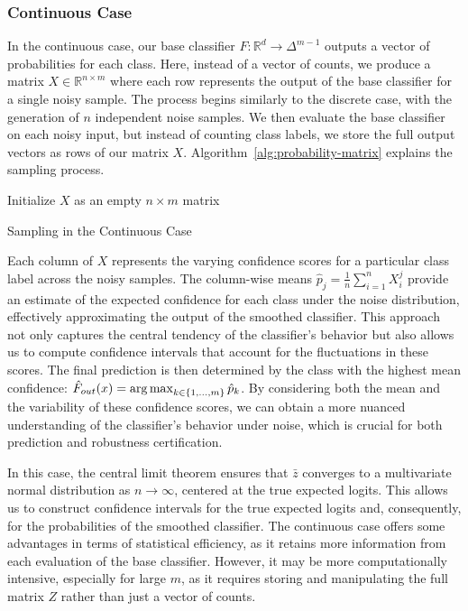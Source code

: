 \subsubsection{Continuous Case}\label{subsubsec:continuous-case-monte-carlo-simulation}
In the continuous case, our base classifier $F: \mathbb{R}^d \rightarrow \Delta^{m-1}$ outputs a vector of probabilities for each class.
Here, instead of a vector of counts, we produce a matrix $X \in \mathbb{R}^{n \times m}$ where each row represents the output of the base classifier for a single noisy sample.
The process begins similarly to the discrete case, with the generation of $n$ independent noise samples.
We then evaluate the base classifier on each noisy input, but instead of counting class labels, we store the full output vectors as rows of our matrix $X$.
Algorithm~\ref{alg:probability-matrix} explains the sampling process.
\begin{algorithm}[h]
    \DontPrintSemicolon
    Initialize $X$ as an empty $n \times m$ matrix\;
    \caption{Sampling in the Continuous Case}\label{alg:probability-matrix}
\end{algorithm}

Each column of $X$ represents the varying confidence scores for a particular class label across the noisy samples.
The column-wise means $\hat{p}_j = \frac{1}{n} \sum_{i=1}^n X_i^j$ provide an estimate of the expected confidence for each class under the noise distribution, effectively approximating the output of the smoothed classifier.
This approach not only captures the central tendency of the classifier's behavior but also allows us to compute confidence intervals that account for the fluctuations in these scores.
The final prediction is then determined by the class with the highest mean confidence: $\hat{F}_{out}(x) = \operatorname*{arg\,max}_{k \in \{1, \ldots, m\}} \hat{p}_k$.
By considering both the mean and the variability of these confidence scores, we can obtain a more nuanced understanding of the classifier's behavior under noise, which is crucial for both prediction and robustness certification.

In this case, the central limit theorem ensures that $\bar{z}$ converges to a multivariate normal distribution as $n \rightarrow \infty$, centered at the true expected logits.
This allows us to construct confidence intervals for the true expected logits and, consequently, for the probabilities of the smoothed classifier.
The continuous case offers some advantages in terms of statistical efficiency, as it retains more information from each evaluation of the base classifier.
However, it may be more computationally intensive, especially for large $m$, as it requires storing and manipulating the full matrix $Z$ rather than just a vector of counts.

